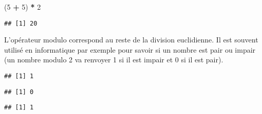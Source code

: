 \documentclass[]{book}
\newenvironment{Shaded}{\begin{snugshade}}{\end{snugshade}}
\newcommand{\DecValTok}[1]{\textcolor[rgb]{0.00,0.00,0.81}{#1}}
\newcommand{\StringTok}[1]{\textcolor[rgb]{0.31,0.60,0.02}{#1}}
\newcommand{\OperatorTok}[1]{\textcolor[rgb]{0.81,0.36,0.00}{\textbf{#1}}}
\newcommand{\NormalTok}[1]{#1}
\theoremstyle{definition}
\theoremstyle{definition}
\theoremstyle{definition}
\theoremstyle{remark}
\begin{document}
\begin{Shaded}
\begin{Highlighting}[]
\NormalTok{(}\DecValTok{5} \OperatorTok{+}\StringTok{ }\DecValTok{5}\NormalTok{) }\OperatorTok{*}\StringTok{ }\DecValTok{2}
\end{Highlighting}
\end{Shaded}

\begin{verbatim}
## [1] 20
\end{verbatim}

L'opérateur modulo correspond au reste de la division euclidienne. Il
est souvent utilisé en informatique par exemple pour savoir si un nombre
est pair ou impair (un nombre modulo 2 va renvoyer 1 si il est impair et
0 si il est pair).

\begin{Shaded}
\end{Shaded}

\begin{verbatim}
## [1] 1
\end{verbatim}

\begin{Shaded}
\end{Shaded}

\begin{verbatim}
## [1] 0
\end{verbatim}

\begin{Shaded}
\end{Shaded}

\begin{verbatim}
## [1] 1
\end{verbatim}

\begin{Shaded}
\end{Shaded}
\end{document}
